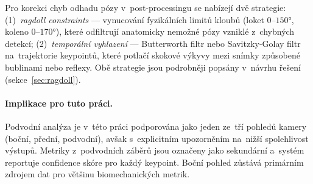 Pro korekci chyb odhadu pózy v~post-processingu se nabízejí dvě strategie: (1)~\textit{ragdoll constraints} --- vynucování fyzikálních limitů kloubů (loket $0$--$150°$, koleno $0$--$170°$), které odfiltrují anatomicky nemožné pózy vzniklé z~chybných detekcí; (2)~\textit{temporální vyhlazení} --- Butterworth filtr nebo Savitzky-Golay filtr na~trajektorie keypointů, které potlačí skokové výkyvy mezi snímky způsobené bublinami nebo reflexy. Obě strategie jsou podrobněji popsány v~návrhu řešení (sekce~\ref{sec:ragdoll}).

\paragraph{Implikace pro tuto práci.}
Podvodní analýza je v~této práci podporována jako jeden ze~tří pohledů kamery (boční, přední, podvodní), avšak s~explicitním upozorněním na~nižší spolehlivost výstupů. Metriky z~podvodních záběrů jsou označeny jako sekundární a~systém reportuje confidence skóre pro každý keypoint. Boční pohled zůstává primárním zdrojem dat pro většinu biomechanických metrik.
